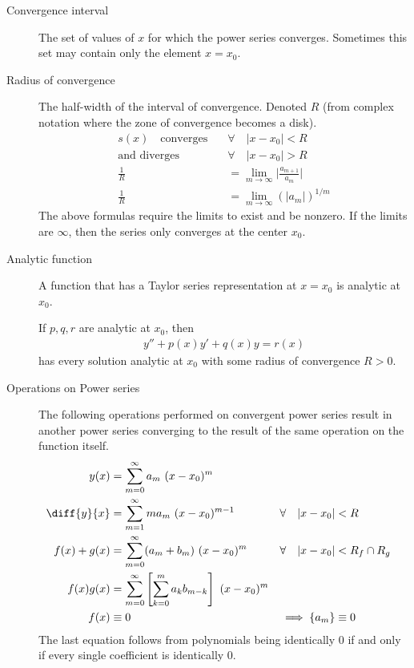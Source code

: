 \begin{description}
    \item[Convergence interval] The set of values of $ x $ for which the power
        series converges. Sometimes this set may contain only the element $ x = x_0 $.
    \item[Radius of convergence] The half-width of the interval of convergence. Denoted
        $ R $ (from complex notation where the zone of convergence becomes a disk).
        \begin{align}
            s(x) \quad \text{converges} \quad & \forall \quad |x - x_0| < R \\
            \text{and diverges} \quad         & \forall \quad |x - x_0| > R \\
            \frac{1}{R}                       & = \lim_{m \to \infty}
            \Big| \frac{a_{m+1}}{a_m}\Big|                                  \\
            \frac{1}{R}                       & = \lim_{m \to \infty}
            (|a_m|)^{1/m}
        \end{align}
        The above formulas require the limits to exist and be nonzero. If the limits
        are $ \infty $, then the series only converges at the center $ x_0 $.
    \item[Analytic function] A function that has a Taylor series representation at
        $ x = x_0 $ is analytic at $ x_0 $. \par
        If $ p, q, r $ are analytic at $ x_0 $, then
        \begin{align}
            y'' + p(x)y' + q(x)y = r(x) \nonumber
        \end{align}
        has every solution analytic at $ x_0 $ with some radius of convergence
        $ R > 0 $.
    \item[Operations on Power series] The following operations performed on convergent
        power series result in another power series converging to the result of the same
        operation on the function itself.
        \begin{align}
            y(x)                       & = \sum_{m = 0}^{\infty}a_m\ (x - x_0)^{m}       \\
            \diff{y}{x}                & = \sum_{m = 1}^{\infty}m a_m\ (x - x_0)^{m-1} &
            \forall \quad |x - x_0|    & < R                                             \\
            f(x) + g(x)                & = \sum_{m = 0}^{\infty}
            (a_m + b_m)\ (x - x_0)^{m} &
            \forall \quad |x - x_0|    & < R_f \cap R_g                                  \\
            f(x)g(x)                   & = \sum_{m = 0}^{\infty} \left[ \sum_{k=0}^{m}
            a_kb_{m-k} \right]\ (x - x_0)^{m}                                            \\
            f(x)                       & \equiv 0                                      &
            \implies \{a_m\}           & \equiv 0
        \end{align}
        The last equation follows from polynomials being identically $ 0 $ if and
        only if every single coefficient is identically $ 0 $.
\end{description}

